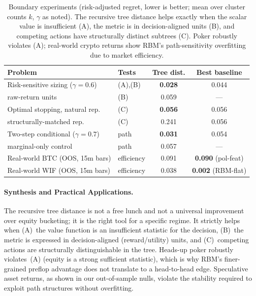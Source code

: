 \documentclass[11pt]{article}
\begin{document}
\begin{table}[t]
\centering
\caption{Boundary experiments (risk-adjusted regret, lower is better;
mean over cluster counts $k$, $\gamma$ as noted). The recursive tree
distance helps exactly when the scalar value is insufficient (A), the
metric is in decision-aligned units (B), and competing actions have
structurally distinct subtrees (C). Poker robustly violates (A); real-world crypto returns show RBM's path-sensitivity overfitting due to market efficiency.}
\label{tab:boundary}
\small
\begin{tabular}{llcc}
\toprule
Problem & Tests & Tree dist. & Best baseline \\
\midrule
Risk-sensitive sizing ($\gamma{=}0.6$) & (A),(B) & \textbf{0.028} & 0.044 \\
\quad raw-return units & (B) & 0.059 & --- \\
Optimal stopping, natural rep. & (C) & \textbf{0.056} & 0.056 \\
\quad structurally-matched rep. & (C) & 0.241 & 0.056 \\
Two-step conditional ($\gamma{=}0.7$) & path & \textbf{0.031} & 0.054 \\
\quad marginal-only control & path & 0.057 & --- \\
\midrule
Real-world BTC (OOS, 15m bars) & efficiency & 0.091 & \textbf{0.090} (pol-feat) \\
Real-world WIF (OOS, 15m bars) & efficiency & 0.038 & \textbf{0.002} (RBM-flat) \\
\bottomrule
\end{tabular}
\end{table}

\paragraph{Synthesis and Practical Applications.} The recursive tree distance is not a
free lunch and not a universal improvement over equity bucketing; it is
the right tool for a specific regime. It strictly helps when
(A)~the value function is an insufficient statistic for the decision,
(B)~the metric is expressed in decision-aligned (reward/utility) units,
and (C)~competing actions are structurally distinguishable in the tree.
Heads-up poker robustly violates~(A) (equity is a strong sufficient statistic), which is why RBM's finer-grained preflop advantage does not translate to a head-to-head edge. Speculative asset returns, as shown in our out-of-sample nulls, violate the stability required to exploit path structures without overfitting. 
\end{document}
